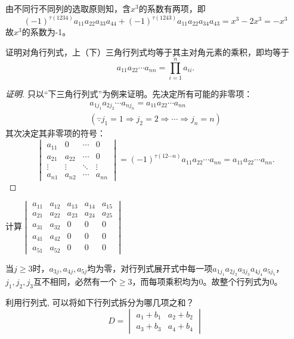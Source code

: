 \begin{solution}
由不同行不同列的选取原则知，含$x^3$的系数有两项，即
$$(-1)^{\tau(1234)} a_{11}a_{22}a_{33}a_{44} + (-1)^{\tau(1243)} a_{11}a_{22}a_{34}a_{43} = x^3 - 2x^3 = -x^3$$
故$x^3$的系数为-1。
\end{solution}

\begin{eg}
证明对角行列式，上（下）三角行列式均等于其主对角元素的乘积，即均等于
$$a_{11}a_{22}\cdots a_{nn} = \prod\limits_{i=1}^n a_{ii}.$$
\end{eg}

\begin{proof}[证明]
只以“下三角行列式”为例来证明。先决定所有可能的非零项：
\begin{eqnarray*}
a_{1j_1}a_{2j_2}\cdots a_{nj_n} = a_{11}a_{22}\cdots a_{nn} \\
(\because j_1 = 1 \Rightarrow j_2 = 2 \Rightarrow \cdots \Rightarrow j_n = n)
\end{eqnarray*}
其次决定其非零项的符号：
$$\begin{vmatrix}
a_{11} & 0 & \cdots & 0 \\ a_{21} & a_{22} & \cdots & 0 \\ \vdots & \vdots & \ddots & \vdots \\ a_{n1} & a_{n2} & \cdots & a_{nn} \end{vmatrix} = (-1)^{\tau(12\cdots n)}a_{11}a_{22}\cdots a_{nn} = a_{11}a_{22}\cdots a_{nn}.$$
\end{proof}

\begin{eg}
计算$\begin{vmatrix}
a_{11} & a_{12} & a_{13} & a_{14} & a_{15} \\a_{21} & a_{22} & a_{23} & a_{24} & a_{25} \\ a_{31} & a_{32} & 0 & 0 & 0 \\ a_{41} & a_{42} & 0 & 0 & 0 \\ a_{51} & a_{52} & 0 & 0 & 0 \end{vmatrix}$
\end{eg}

\begin{solution}
当$j\geqslant 3$时，$a_{3j}, a_{4j}, a_{5j}$均为零，对行列式展开式中每一项$a_{1j_1}a_{2j_2}a_{3j_3}a_{4j_4}a_{5j_5}$，$j_1,j_2,j_3$互不相同，必然有一个$\geqslant 3$，而每项乘积均为0。故整个行列式为0。
\end{solution}

\begin{eg}
利用行列式, 可以将如下行列式拆分为哪几项之和？
$$D = \begin{vmatrix}
a_1 + b_1 & a_2 + b_2 \\ a_3 + b_3 & a_4 + b_4 \end{vmatrix}$$
\end{eg}

